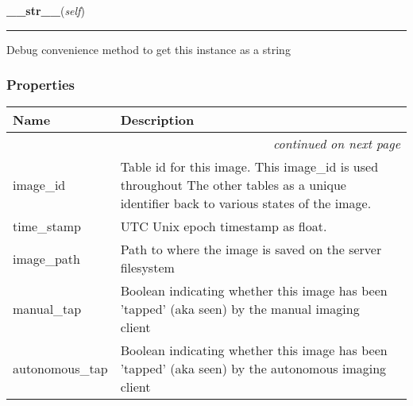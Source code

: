     \label{src:dao:model:incoming_image:incoming_image:__str__}

    \vspace{0.5ex}

\hspace{.8\funcindent}\begin{boxedminipage}{\funcwidth}

    \raggedright \textbf{\_\_str\_\_}(\textit{self})

    \vspace{-1.5ex}

    \rule{\textwidth}{0.5\fboxrule}
\setlength{\parskip}{2ex}
    Debug convenience method to get this instance as a string

\setlength{\parskip}{1ex}
    \end{boxedminipage}



  \subsubsection{Properties}

    \vspace{-1cm}
\hspace{\varindent}\begin{longtable}{|p{\varnamewidth}|p{\vardescrwidth}|l}
\cline{1-2}
\cline{1-2} \centering \textbf{Name} & \centering \textbf{Description}& \\
\cline{1-2}
\endhead\cline{1-2}\multicolumn{3}{r}{\small\textit{continued on next page}}\\\endfoot\cline{1-2}
\endlastfoot\raggedright i\-m\-a\-g\-e\-\_\-i\-d\- & \raggedright Table id for this image. This image\_id is used throughout The 
          other tables as a unique identifier back to various states of the
          image.&\\
\cline{1-2}
\raggedright t\-i\-m\-e\-\_\-s\-t\-a\-m\-p\- & \raggedright UTC Unix epoch timestamp as float.&\\
\cline{1-2}
\raggedright i\-m\-a\-g\-e\-\_\-p\-a\-t\-h\- & \raggedright Path to where the image is saved on the server filesystem&\\
\cline{1-2}
\raggedright m\-a\-n\-u\-a\-l\-\_\-t\-a\-p\- & \raggedright Boolean indicating whether this image has been 'tapped' (aka 
          seen) by the manual imaging client&\\
\cline{1-2}
\raggedright a\-u\-t\-o\-n\-o\-m\-o\-u\-s\-\_\-t\-a\-p\- & \raggedright Boolean indicating whether this image has been 'tapped' (aka 
          seen) by the autonomous imaging client&\\
\cline{1-2}
\end{longtable}

